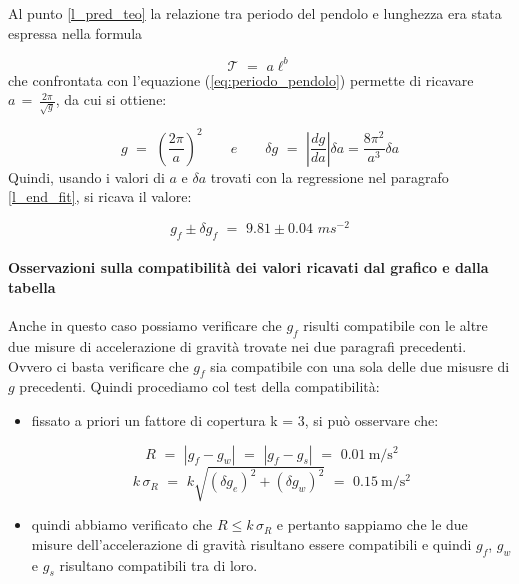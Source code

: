 Al punto \ref{l_pred_teo} la relazione tra periodo del pendolo e lunghezza era stata espressa nella formula

\begin{equation*}
\mathcal{T} \,\, = \,\, a\ell^b
\end{equation*}
%
che confrontata con l'equazione (\ref{eq:periodo_pendolo}) permette di ricavare $a \, = \, \frac{2 \pi}{\sqrt{g}}$, da cui si ottiene:

\begin{equation*}
g \,\, = \,\, \left( \frac{2 \pi}{a}\right)^2 \quad\quad e \quad\quad \delta g \,\, = \,\, \left| \frac{dg}{da} \right|  \delta a = \frac{8 \pi^2}{a^3} \delta a
\end{equation*}
%
Quindi, usando i valori di $a$ e $\delta a$ trovati con la regressione nel paragrafo \ref{l_end_fit}, si ricava il valore:

\begin{equation}
g_f \pm \delta g_f \,\, = \,\, 9.81 \pm 0.04 \,\, ms^{-2}
\end{equation}

\paragraph{Osservazioni sulla compatibilità dei valori ricavati dal grafico e dalla tabella\\} 
Anche in questo caso possiamo verificare che $g_f$ risulti compatibile con le altre due misure di accelerazione di gravità trovate nei due paragrafi precedenti. Ovvero ci basta verificare che $g_f$ sia compatibile con una sola delle due misusre di $g$ precedenti. Quindi procediamo col test della compatibilità:
\begin{itemize}
	\item{fissato a priori un fattore di copertura k = 3, si può osservare che:
	
		\begin{equation*}
			R \,\, = \,\, |g_f - g_w| \,\, = \,\, |g_f - g_s| \,\, = \,\, \SI{0.01}{\metre\per\square\second}
		\end{equation*}
		\begin{equation*}
			k\,\sigma_R \,\, = \,\, k\sqrt{(\delta g_e)^2 + (\delta g_w)^2} \,\, = \,\, \SI{0.15}{\metre\per\square\second}
		\end{equation*}
		}
	\item{quindi abbiamo verificato che $R \leq k\,\sigma_R$ e pertanto sappiamo che le due misure dell'accelerazione di gravità risultano essere compatibili e quindi $g_f$, $g_w$ e $g_s$ risultano compatibili tra di loro.}
\end{itemize}

